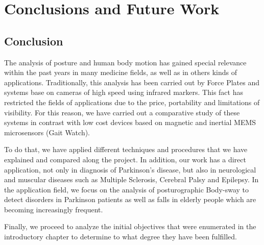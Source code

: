 \chapter{Conclusions and Future Work}
\label{ch:Conclusions}
\section{Conclusion}
The analysis of posture and human body motion  has gained special relevance within the past years in many medicine fields, as well as in others kinds of applications. Traditionally, this analysis has been carried out by Force Plates and systems base on cameras of high speed using infrared markers. This fact has restricted the fields of applications due to the price, portability and limitations of visibility. For this reason, we have carried out a comparative study of these systems in contrast with low cost devices based on magnetic and inertial MEMS microsensors (Gait Watch).

To do that, we have applied different techniques and procedures that we have explained and compared along the project.
In addition, our work has a direct application, not only in diagnosis of Parkinson’s disease, but also in neurological and muscular diseases such as Multiple Sclerosis, Cerebral Palsy and Epilepsy. In the application field, we focus on the analysis of posturographic  Body-sway to detect disorders in Parkinson patients as well as falls in elderly people which are becoming increasingly frequent.

Finally, we proceed to analyze the initial objectives that were enumerated in the introductory chapter to determine to what degree they have been fulfilled.


